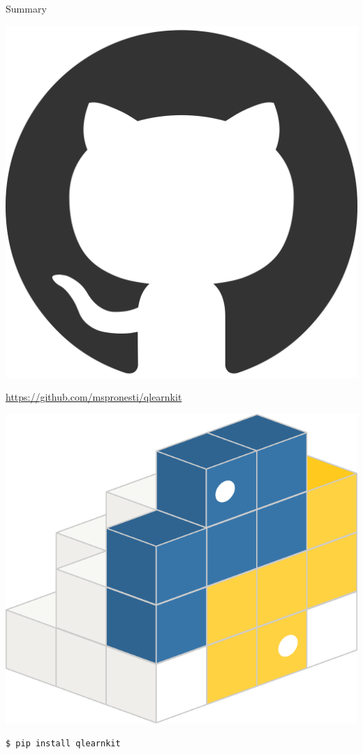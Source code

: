 	\begin{frame}{Summary}
    	\begin{minipage}[c]{0.2\textwidth}
    	\centering
			\includegraphics[width=0.5\linewidth]{gh_logo}
		\end{minipage}
		\begin{minipage}[c]{0.7\textwidth}
    		\url{https://github.com/mspronesti/qlearnkit}
		\end{minipage}
    	
    	
    	 \vspace{\abovedisplayskip}
    	\begin{minipage}[c]{0.2\textwidth}
    	\centering
			\includegraphics[width=0.5\linewidth]{pypilogo}
		\end{minipage}
		\begin{minipage}[c]{0.7\textwidth}
                \texttt{\$ pip install qlearnkit}
		\end{minipage}
	

\end{frame}
